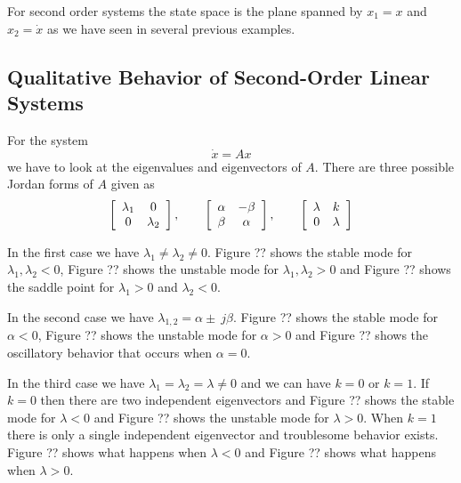 For second order systems the state space is the plane spanned by $x_1 = x$ and $x_2 = \dot{x}$ as we have seen in several previous examples.

\subsection{Qualitative Behavior of Second-Order Linear Systems}
For the system
$$\dot{x} = Ax$$
we have to look at the eigenvalues and eigenvectors of $A$. There are three possible Jordan forms of $A$ given as
\begin{align*}
\left[\begin{array}{c c} \lambda_1 & 0 \\ 0 & \lambda_2 \end{array}\right], \qquad
\left[\begin{array}{c c} \alpha & -\beta \\ \beta & \alpha \end{array}\right], \qquad
\left[\begin{array}{c c} \lambda & k \\ 0 & \lambda \end{array}\right]
\end{align*}

In the first case we have $\lambda_1\neq\lambda_2\neq0$. Figure ?? shows the stable mode for $\lambda_1, \lambda_2<0$, Figure ?? shows the unstable mode for $\lambda_1, \lambda_2>0$ and Figure ?? shows the saddle point for $\lambda_1>0$ and $\lambda_2<0$.

In the second case we have $\lambda_{1,2}=\alpha\pm\ j\beta$. Figure ?? shows the stable mode for $\alpha<0$, Figure ?? shows the unstable mode for $\alpha>0$ and Figure ?? shows the oscillatory behavior that occurs when $\alpha=0$.

In the third case we have $\lambda_1=\lambda_2=\lambda\neq0$ and we can have $k=0$ or $k=1$. If $k=0$ then there are two independent eigenvectors and Figure ?? shows the stable mode for $\lambda<0$ and Figure ?? shows the unstable mode for $\lambda>0$. When $k=1$ there is only a single independent eigenvector and troublesome behavior exists. Figure ?? shows what happens when $\lambda<0$ and Figure ?? shows what happens when $\lambda>0$.
